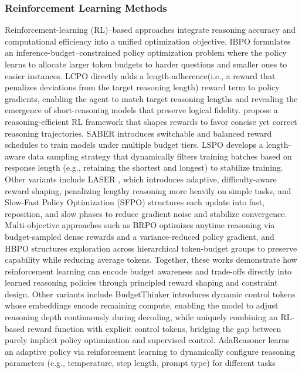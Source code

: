 \documentclass[11pt]{article}
\begin{document}
\subsubsection{Reinforcement Learning Methods}
\label{sec:rl}
Reinforcement-learning (RL)–based approaches integrate reasoning accuracy and computational efficiency into a unified optimization objective.
IBPO \citep{Yu2025IBPO} formulates an inference-budget–constrained policy optimization problem where the policy learns to allocate
larger token budgets to harder questions and smaller ones to easier instances.
LCPO \citep{Aggarwal2025LCPO} directly adds a length-adherence(i.e., a reward that penalizes deviations from the target reasoning length) reward term to policy gradients,
enabling the agent to match target reasoning lengths and revealing the emergence of
short-reasoning models that preserve logical fidelity.
\citep{Arora2025EfficientRL} propose a reasoning-efficient RL framework
that shapes rewards to favor concise yet correct reasoning trajectories.
SABER \citep{Zhao2025SABER} introduces switchable and balanced reward schedules to train models under multiple budget tiers.
LSPO \citep{Chen2025LSPO} develops a length-aware data sampling strategy that dynamically filters training batches based on response length (e.g., retaining the shortest and longest) to stabilize training.
Other variants include LASER \citep{liu2025learnreasonefficientlyadaptive}, which introduces adaptive, difficulty-aware reward shaping, penalizing lengthy reasoning more heavily on simple tasks, and Slow-Fast Policy Optimization (SFPO) \citep{Li2025SFPO} structures each update into fast, reposition, and slow phases to reduce gradient noise and stabilize convergence. Multi-objective approaches such as 
{BRPO} \citep{qi2025optimizinganytimereasoningbudget} optimizes anytime reasoning via budget-sampled dense rewards and a variance-reduced policy gradient, and
{HBPO} \citep{lyu2025hierarchicalbudgetpolicyoptimization} structures exploration across hierarchical token-budget groups to preserve capability while reducing average tokens.
Together, these works demonstrate how reinforcement learning can encode budget awareness and trade-offs directly into learned reasoning policies through principled reward shaping and constraint design.
Other variants include
BudgetThinker \citep{wen2025budgetthinker} introduces dynamic control tokens whose embeddings encode remaining compute, enabling the model to adjust reasoning depth continuously during decoding, while uniquely combining an RL-based reward function with explicit control tokens, bridging the gap between purely implicit policy optimization and supervised control. AdaReasoner \citep{Tan2025AdaReasoner} learns an adaptive policy via reinforcement learning to dynamically configure reasoning parameters (e.g., temperature, step length, prompt type) for different tasks
\end{document}
